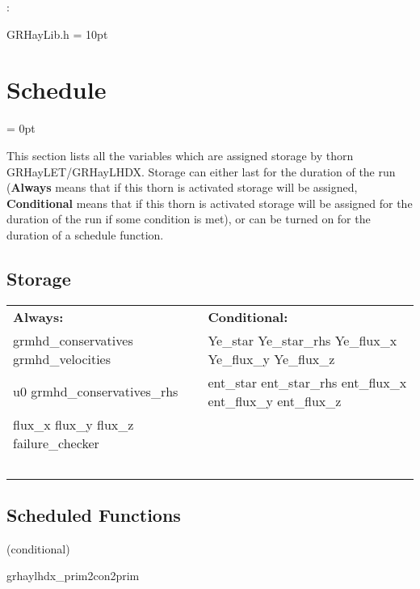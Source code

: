 \documentclass{article}
\begin{document}
\vspace{5mm}

: 

GRHayLib.h
\vspace{2mm}\parskip = 10pt 

\section{Schedule} 


\parskip = 0pt


\noindent This section lists all the variables which are assigned storage by thorn GRHayLET/GRHayLHDX.  Storage can either last for the duration of the run ({\bf Always} means that if this thorn is activated storage will be assigned, {\bf Conditional} means that if this thorn is activated storage will be assigned for the duration of the run if some condition is met), or can be turned on for the duration of a schedule function.


\subsection*{Storage}

\hspace{5mm}

 \begin{tabular*}{160mm}{ll} 

{\bf Always:}& {\bf Conditional:} \\ 
 grmhd\_conservatives grmhd\_velocities &  Ye\_star Ye\_star\_rhs Ye\_flux\_x Ye\_flux\_y Ye\_flux\_z\\ 
 u0 grmhd\_conservatives\_rhs &  ent\_star ent\_star\_rhs ent\_flux\_x ent\_flux\_y ent\_flux\_z\\ 
 flux\_x flux\_y flux\_z failure\_checker & ~\\ 
~ & ~\\ 
\end{tabular*} 


\subsection*{Scheduled Functions}
\vspace{5mm}

   (conditional) 

\hspace{5mm} grhaylhdx\_prim2con2prim 

\hspace{5mm}{\it initialize grhaylhdx variables using hydrobasex initial data } 
\end{document}
